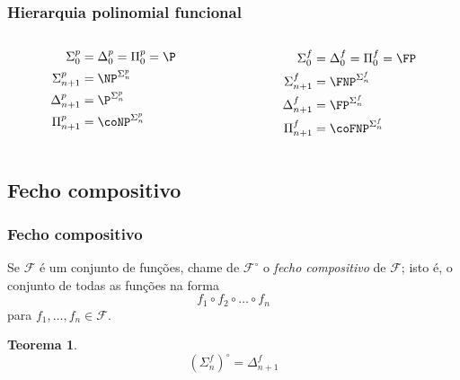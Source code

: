 \documentclass[utf8,notheorems]{beamer}
\newtheorem*{theorem}{Teorema}
\theoremstyle{definition}
\begin{document}
\newlang{}
\begin{frame}
    \frametitle{Hierarquia polinomial funcional}
    \begin{columns}
        \begin{column}{0.2\textwidth}
            \begin{align*}
                \Sigma_0^p &= \Delta_0^p = \Pi_0^p = \P \\
                \Sigma_{n+1}^p &= \NP^{\Sigma_n^p} \\
                \Delta_{n+1}^p &= \P^{\Sigma_n^p} \\
                \Pi_{n+1}^p &= \coNP^{\Sigma_n^p}
            \end{align*}
        \end{column}
        \begin{column}{0.2\textwidth}
            \begin{align*}
                \Sigma_0^f &= \Delta_0^f = \Pi_0^f = \FP \\
                \Sigma_{n+1}^f &= \FNP^{\Sigma_n^f} \\
                \Delta_{n+1}^f &= \FP^{\Sigma_n^f} \\
                \Pi_{n+1}^f &= \coFNP^{\Sigma_n^f}
            \end{align*}
        \end{column}
    \end{columns}
\end{frame}

\subsection{Fecho compositivo}
\begin{frame}
    \frametitle{Fecho compositivo}

    Se $\mathcal F$ é um conjunto de funções,
    chame de $\mathcal F^\circ$
    o \emph{fecho compositivo} de $\mathcal F$;
    isto é, o conjunto de todas as funções na forma
    \begin{equation*}
        f_1 \circ f_2 \circ \dots \circ f_n
    \end{equation*}
    para $f_1, \dots, f_n \in \mathcal F$.

    \begin{theorem}
        \begin{equation*}
            (\Sigma_n^f)^\circ = \Delta_{n+1}^f
        \end{equation*}
    \end{theorem}
\end{frame}
\end{document}
